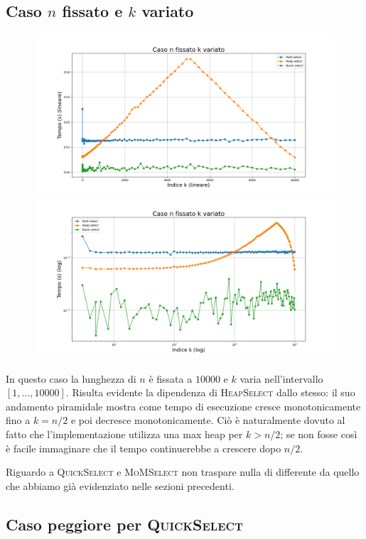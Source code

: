 \documentclass[a4paper,12pt]{article}
\newcommand{\QuickSelect}{\textsc{QuickSelect}}
\newcommand{\HeapSelect}{\textsc{HeapSelect}}
\newcommand{\MoMSelect}{\textsc{MoMSelect}}
\begin{document}
\subsection{Caso $n$ fissato e $k$ variato}
\begin{figure}[h]
    \centering
    \includegraphics[width=.83\textwidth]{graphs/n_fixed_n.png}
    \includegraphics[width=.83\textwidth]{graphs/n_fixed_2xlog.png}
\end{figure}

In questo caso la lunghezza di $n$ è fissata a $10000$ e $k$ varia nell'intervallo $[1,\dots,10000]$.
Risulta evidente la dipendenza di \HeapSelect{} dallo stesso: il suo andamento piramidale mostra come tempo di esecuzione cresce monotonicamente fino a $k=n/2$ e poi decresce monotonicamente.
Ciò è naturalmente dovuto al fatto che l'implementazione utilizza una max heap per $k>n/2$; se non fosse così è facile immaginare che il tempo continuerebbe a crescere dopo $n/2$.

Riguardo a \QuickSelect{} e \MoMSelect{} non traspare nulla di differente da quello che abbiamo già evidenziato nelle sezioni precedenti.

\newpage
\subsection{Caso peggiore per \QuickSelect}
\end{document}

